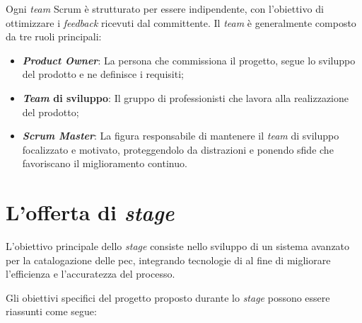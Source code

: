Ogni \emph{team} Scrum è strutturato per essere indipendente, con l'obiettivo di ottimizzare i \emph{feedback} ricevuti dal committente. Il \emph{team} è generalmente composto da tre ruoli principali:

\begin{itemize}
    \item \textbf{\emph{Product Owner}}: La persona che commissiona il progetto, segue lo sviluppo del prodotto e ne definisce i requisiti;
    \item \textbf{\emph{Team} di sviluppo}: Il gruppo di professionisti che lavora alla realizzazione del prodotto;
    \item \textbf{\emph{Scrum Master}}: La figura responsabile di mantenere il \emph{team} di sviluppo focalizzato e motivato, proteggendolo da distrazioni e ponendo sfide che favoriscano il miglioramento continuo.
\end{itemize}

\section{L'offerta di \emph{stage}}
L'obiettivo principale dello \emph{stage} consiste nello sviluppo di un sistema avanzato per la catalogazione delle \gls{pec}, integrando tecnologie di  al fine di migliorare l'efficienza e l'accuratezza del processo.

Gli obiettivi specifici del progetto proposto durante lo \emph{stage} possono essere riassunti come segue:


